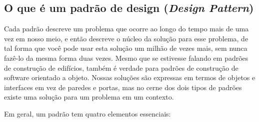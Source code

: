 \subsection{O que é um padrão de design (\emph{Design Pattern})}
\label{sub:introducao}

Cada padrão descreve um problema que ocorre ao longo do tempo
mais de uma vez em nosso meio, e então descreve o núcleo da solução
para esse problema, de tal forma que você pode usar esta solução um milhão de vezes
mais, sem nunca fazê-lo da mesma forma duas vezes. 
Mesmo que se estivesse falando em padrões de construção de edifícios, também é verdade para padrões de construção de software orientado a objeto. Nossas soluções são expressas em termos de objetos e interfaces em vez de paredes e portas, mas no cerne dos dois tipos de padrões existe uma solução para um problema em um contexto.\cite{gamma95}

Em geral, um padrão tem quatro elementos essenciais:\cite{gamma95}

